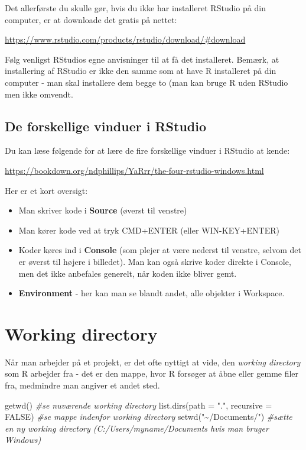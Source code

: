 \documentclass[
]{book}
\newenvironment{Shaded}{\begin{snugshade}}{\end{snugshade}}
\newcommand{\AttributeTok}[1]{\textcolor[rgb]{0.77,0.63,0.00}{#1}}
\newcommand{\CommentTok}[1]{\textcolor[rgb]{0.56,0.35,0.01}{\textit{#1}}}
\newcommand{\ConstantTok}[1]{\textcolor[rgb]{0.00,0.00,0.00}{#1}}
\newcommand{\FunctionTok}[1]{\textcolor[rgb]{0.00,0.00,0.00}{#1}}
\newcommand{\NormalTok}[1]{#1}
\newcommand{\StringTok}[1]{\textcolor[rgb]{0.31,0.60,0.02}{#1}}
\providecommand{\tightlist}{%
  \setlength{\itemsep}{0pt}\setlength{\parskip}{0pt}}
\begin{document}
Det allerførste du skulle gør, hvis du ikke har installeret RStudio på din computer, er at downloade det gratis på nettet:

\url{https://www.rstudio.com/products/rstudio/download/\#download}

Følg venligst RStudios egne anvisninger til at få det installeret. Bemærk, at installering af RStudio er ikke den samme som at have R installeret på din computer - man skal installere dem begge to (man kan bruge R uden RStudio men ikke omvendt.

\hypertarget{de-forskellige-vinduer-i-rstudio}{%
\subsection{De forskellige vinduer i RStudio}\label{de-forskellige-vinduer-i-rstudio}}

Du kan læse følgende for at lære de fire forskellige vinduer i RStudio at kende:

\url{https://bookdown.org/ndphillips/YaRrr/the-four-rstudio-windows.html}

Her er et kort oversigt:

\begin{itemize}
\tightlist
\item
  Man skriver kode i \textbf{Source} (øverst til venstre)
\item
  Man kører kode ved at tryk CMD+ENTER (eller WIN-KEY+ENTER)
\item
  Koder køres ind i \textbf{Console} (som plejer at være nederst til venstre, selvom det er øverst til højere i billedet). Man kan også skrive koder direkte i Console, men det ikke anbefales generelt, når koden ikke bliver gemt.
\item
  \textbf{Environment} - her kan man se blandt andet, alle objekter i Workspace.
\end{itemize}

\hypertarget{working-directory}{%
\section{Working directory}\label{working-directory}}

Når man arbejder på et projekt, er det ofte nyttigt at vide, den \emph{working directory} som R arbejder fra - det er den mappe, hvor R forsøger at åbne eller gemme filer fra, medmindre man angiver et andet sted.

\begin{Shaded}
\begin{Highlighting}[]
\FunctionTok{getwd}\NormalTok{() }\CommentTok{\#se nuværende working directory}
\FunctionTok{list.dirs}\NormalTok{(}\AttributeTok{path =} \StringTok{"."}\NormalTok{, }\AttributeTok{recursive =} \ConstantTok{FALSE}\NormalTok{) }\CommentTok{\#se mappe indenfor working directory}
\FunctionTok{setwd}\NormalTok{(}\StringTok{"\textasciitilde{}/Documents/"}\NormalTok{) }\CommentTok{\#sætte en ny working directory (C:/Users/myname/Documents hvis man bruger Windows)}
\end{Highlighting}
\end{Shaded}
\end{document}
